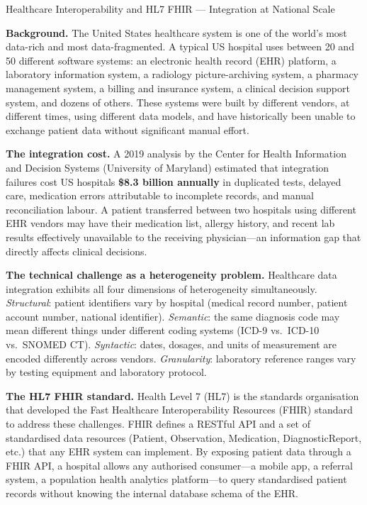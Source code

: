 \begin{casestudy}{Healthcare Interoperability and HL7 FHIR --- Integration at National Scale}

\textbf{Background.}
The United States healthcare system is one of the world's most data-rich
and most data-fragmented. A typical US hospital uses between 20 and 50
different software systems: an electronic health record (EHR) platform,
a laboratory information system, a radiology picture-archiving system,
a pharmacy management system, a billing and insurance system, a
clinical decision support system, and dozens of others. These systems
were built by different vendors, at different times, using different
data models, and have historically been unable to exchange patient data
without significant manual effort.

\smallskip
\textbf{The integration cost.}
A 2019 analysis by the Center for Health Information and Decision
Systems (University of Maryland) estimated that integration failures
cost US hospitals \textbf{\$8.3 billion annually} in duplicated tests,
delayed care, medication errors attributable to incomplete records, and
manual reconciliation labour. A patient transferred between two hospitals
using different EHR vendors may have their medication list, allergy
history, and recent lab results effectively unavailable to the receiving
physician---an information gap that directly affects clinical decisions.

\smallskip
\textbf{The technical challenge as a heterogeneity problem.}
Healthcare data integration exhibits all four dimensions of
heterogeneity simultaneously. \emph{Structural}: patient identifiers
vary by hospital (medical record number, patient account number,
national identifier). \emph{Semantic}: the same diagnosis code may mean
different things under different coding systems (ICD-9 vs.\ ICD-10 vs.\
SNOMED CT). \emph{Syntactic}: dates, dosages, and units of measurement
are encoded differently across vendors. \emph{Granularity}: laboratory
reference ranges vary by testing equipment and laboratory protocol.

\smallskip
\textbf{The HL7 FHIR standard.}
Health Level 7 (HL7) is the standards organisation that developed the
Fast Healthcare Interoperability Resources (FHIR) standard to address
these challenges. FHIR defines a RESTful API and a set of standardised
data resources (Patient, Observation, Medication, DiagnosticReport,
etc.) that any EHR system can implement. By exposing patient data
through a FHIR API, a hospital allows any authorised consumer---a mobile
app, a referral system, a population health analytics platform---to
query standardised patient records without knowing the internal database
schema of the EHR.


\end{casestudy}
